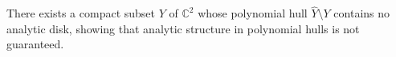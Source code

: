 
There exists a compact subset $Y$ of $\mathbb{C}^2$ whose polynomial hull $\hat{Y} \setminus Y$ contains no analytic disk, showing that analytic structure in polynomial hulls is not guaranteed.
